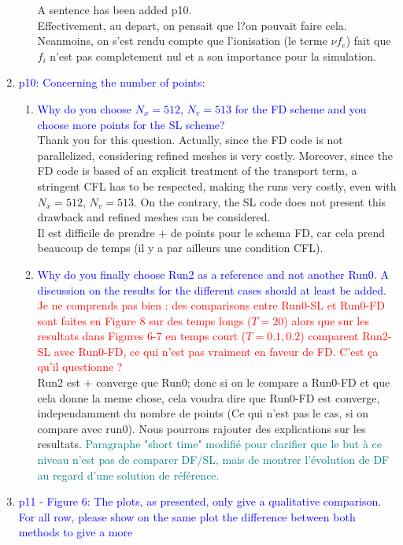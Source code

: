 \documentclass{article}
\begin{document}
\begin{enumerate}
\begin{enumerate}
A sentence has been added p10. \\
{\small Effectivement, au depart, on pensait que l?on pouvait faire cela. Neanmoins, on s'est rendu compte que l'ionisation 
(le terme $\nu f_e$) fait que $f_i$ n'est pas completement nul et a son importance pour la simulation.}
\end{enumerate}
    \item \textcolor{blue}{p10: Concerning the number of points:}
    \begin{enumerate}
    \item \textcolor{blue}{Why do you choose $N_x=512$, $N_v=513$ for the FD scheme and you choose more points
for the SL scheme?}\\ 
Thank you for this question. Actually, since the FD code is not parallelized, considering refined meshes is very costly. 
Moreover, since the FD code is based of an explicit treatment of the transport term, a stringent CFL has to be respected, making the 
runs very costly, even with $N_x=512$, $N_v=513$. On the contrary, the SL code does not present this drawback and 
refined meshes can be considered. \\
{\small Il est difficile de prendre + de points pour le schema FD, car cela prend beaucoup de temps (il y a par ailleurs une condition CFL).}
\item \textcolor{blue}{Why do you finally choose Run2 as a reference and not another Run0. A discussion
on the results for the different cases should at least be added.}\\ 
\textcolor{red}{Je ne comprends pas bien : des comparisons entre Run0-SL et Run0-FD sont faites en Figure 8 sur des temps longs 
($T=20$) alors que sur les resultats dans Figures 6-7 en temps court ($T=0.1, 0.2$) comparent Run2-SL avec Run0-FD, ce qui n'est pas 
vraiment en faveur de FD. C'est \c{c}a qu'il questionne ?} \\ 
{\small Run2 est + converge que Run0; donc si on le compare a Run0-FD et que cela donne la meme chose, cela voudra dire que Run0-FD est converge, independamment du nombre de points (Ce qui n'est pas le cas, si on compare avec run0).  
Nous pourrons rajouter des explications sur les resultats.}
\textcolor{teal}{Paragraphe "short time" modifié pour clarifier que le but à ce niveau n'est pas de comparer DF/SL, mais de montrer l'évolution de DF au regard d'une solution de référence.}
\end{enumerate}
    \item \textcolor{blue}{p11 - Figure 6: The plots, as presented, only give a qualitative comparison. For all row, please show on the same plot the difference between both methods to give a more
}
\end{enumerate}
\end{document}
